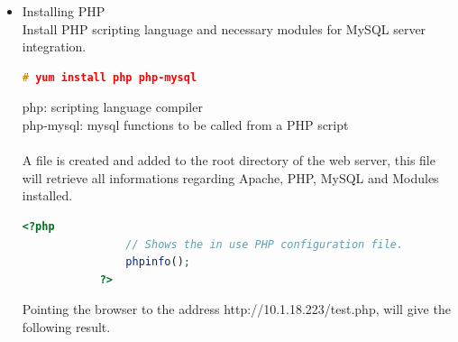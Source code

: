 \begin{itemize}
\begin{lstlisting}[language=c, stepnumber=0, tabsize=1]
				Copyright (c) 2000, 2011, Oracle and/or its affiliates. All rights reserved.

				Oracle is a registered trademark of Oracle Corporation and/or its
				affiliates. Other names may be trademarks of their respective
				owners.

				Type 'help;' or '\h' for help. Type '\c' to clear the current input statement.

				mysql> 
			\end{lstlisting}
			At this moment the database is set with username root and an empty password. For security reasons a password is set for the MySQL server.\\\\
			Changing MySQL root password
			\begin{lstlisting}[language=c, stepnumber=0, tabsize=1]
				mysql> USE mysql;
				mysql> UPDATE user SET Password=PASSWORD('new password') WHERE user='root';
				mysql> FLUSH PRIVILEGES;
			\end{lstlisting}
			With the instruction \textbf{USE mysql} the database directory mysql is open, and with \textbf{UPDATE user SET Password=PASSWORD ('new password') WHERE user='root'} the password for the user 'root' is updated to the desired one. \textbf{FLUSH PRIVILEGES} erases the privileges in cache and reloads the the new privileges in the MySQL server.
		\item Installing PHP \\
		Install PHP scripting language and necessary modules for MySQL server integration.
		\begin{lstlisting}[language=c, stepnumber=0, tabsize=1]
			# yum install php php-mysql
		\end{lstlisting}
			php: scripting language compiler\\
			php-mysql: mysql functions to be called from a PHP script\\
		\\
		A file is created and added to the root directory of the web server, this file will retrieve all informations regarding Apache, PHP, MySQL and Modules installed.
		\begin{lstlisting}[language=php, stepnumber=0, tabsize=1]
			<?php
				// Shows the in use PHP configuration file.
				phpinfo();
			?>
		\end{lstlisting}
		Pointing the browser to the address http://10.1.18.223/test.php, will give the following result.
		\begin{figure}[H]
			\begin{centering}

\end{centering}
\end{figure}
\end{itemize}
